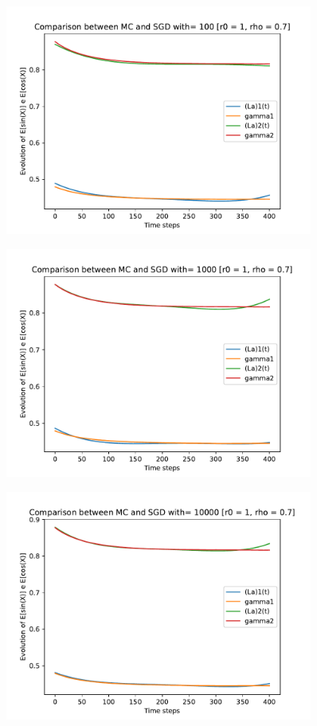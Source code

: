 \documentclass[a4paper,11pt,openright]{report}
\begin{document}
\begin{figure}[H]
\centering
\includegraphics[width=0.9\textwidth]{images/graphs T = 4/n = 4, M = 100 sine and cosine.pdf}
\end{figure}
\begin{figure}[H]
\centering
\includegraphics[width=0.9\textwidth]{images/graphs T = 4/n = 4, M = 1000 sine and cosine.pdf}
\end{figure}
\begin{figure}[H]
\centering
\includegraphics[width=0.9\textwidth]{images/graphs T = 4/n = 4, M = 10000 sine and cosine.pdf}
\end{figure}
\newpage
\end{document}
